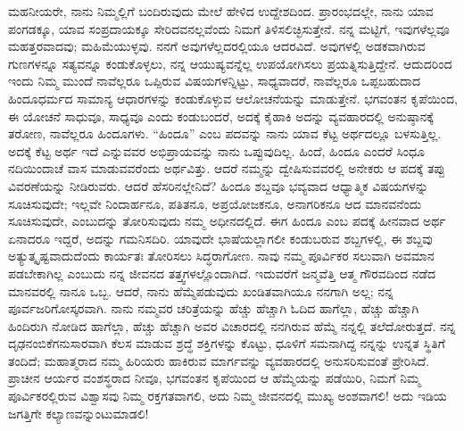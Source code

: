 ಮಹನೀಯರೇ, ನಾನು ನಿಮ್ಮಲ್ಲಿಗೆ ಬಂದಿರುವುದು ಮೇಲೆ ಹೇಳಿದ ಉದ್ದೇಶದಿಂದ. ಪ್ರಾರಂಭದಲ್ಲೇ, ನಾನು ಯಾವ ಪಂಗಡಕ್ಕೂ, ಯಾವ ಸಂಪ್ರದಾಯಕ್ಕೂ ಸೇರಿದವನಲ್ಲವೆಂದು ನಿಮಗೆ ತಿಳಿಸಲಿಚ್ಛಿಸುತ್ತೇನೆ. ನನ್ನ ಮಟ್ಟಿಗೆ, ಇವುಗಳೆಲ್ಲವೂ ಮಹತ್ತರವಾದವು; ಮಹಿಮೆಯುಳ್ಳವು. ನನಗೆ ಅವುಗಳೆಲ್ಲದರಲ್ಲಿಯೂ ಆದರವಿದೆ. ಅವುಗಳಲ್ಲಿ ಅಡಕವಾಗಿರುವ ಗುಣಗಳನ್ನೂ ಸತ್ಯವನ್ನೂ ಕಂಡುಕೊಳ್ಳಲು, ನನ್ನ ಆಯುಷ್ಯವನ್ನೆಲ್ಲ ಉಪಯೋಗಿಸಲು ಪ್ರಯತ್ನಿಸುತ್ತಿದ್ದೇನೆ. ಆದುದರಿಂದ ಇಂದು ನಿಮ್ಮ ಮುಂದೆ ನಾವೆಲ್ಲರೂ ಒಪ್ಪಿರುವ ವಿಷಯಗಳನ್ನಿಟ್ಟು, ಸಾಧ್ಯವಾದರೆ, ನಾವೆಲ್ಲರೂ ಒಪ್ಪಬಹುದಾದ ಹಿಂದೂಧರ್ಮದ ಸಾಮಾನ್ಯ ಆಧಾರಗಳನ್ನು ಕಂಡುಕೊಳ್ಳುವ ಆಲೋಚನೆಯನ್ನು ಮಾಡುತ್ತೇನೆ. ಭಗವಂತನ ಕೃಪೆಯಿಂದ, ಈ ಯೋಚನೆ ಸಾಧುವೂ, ಸಾಧ್ಯವೂ ಎಂದು ಕಂಡುಬಂದರೆ, ಅದಕ್ಕೆ ಕೈಹಾಕಿ ಅದನ್ನು ವ್ಯವಹಾರದಲ್ಲಿ ಅನುಷ್ಠಾನಕ್ಕೆ ತರೋಣ, ನಾವೆಲ್ಲರೂ ಹಿಂದೂಗಳು. “ಹಿಂದೂ” ಎಂಬ ಪದವನ್ನು ನಾನು ಯಾವ ಕೆಟ್ಟ ಅರ್ಥದಲ್ಲೂ ಬಳಸುತ್ತಿಲ್ಲ. ಅದಕ್ಕೆ ಕೆಟ್ಟ ಅರ್ಥ ಇದೆ ಎನ್ನುವವರ ಅಭಿಪ್ರಾಯವನ್ನು ನಾನು ಒಪ್ಪುವುದಿಲ್ಲ. ಹಿಂದೆ, ಹಿಂದೂ ಎಂದರೆ ಸಿಂಧೂ ನದಿಯಿಂದಾಚೆ ವಾಸ ಮಾಡುವವರೆಂದು ಅರ್ಥವಿತ್ತು. ಆದರೆ ನಮ್ಮನ್ನು ದ್ವೇಷಿಸುವವರಲ್ಲಿ ಅನೇಕರು ಆ ಪದಕ್ಕೆ ತಪ್ಪು ವಿವರಣೆಯನ್ನು ನೀಡಿರುವರು. ಆದರೆ ಹೆಸರಿನಲ್ಲೇನಿದೆ? ಹಿಂದೂ ಶಬ್ದವೂ ಭವ್ಯವಾದ ಆಧ್ಯಾತ್ಮಿಕ ವಿಷಯಗಳನ್ನು ಸೂಚಿಸುವುದೇ; ಇಲ್ಲವೇ ನಿಂದಾರ್ಹನೂ, ಪತಿತನೂ, ಅಪ್ರಯೋಜಕನೂ, ಅನಾಗರಿಕನೂ ಆದ ಮಾನವನೆಂದು ಸೂಚಿಸುವುದೇ, ಎಂಬುದನ್ನು ತೋರಿಸುವುದು ನಮ್ಮ ಅಧೀನದಲ್ಲಿದೆ. ಈಗ ಹಿಂದೂ ಎಂಬ ಪದಕ್ಕೆ ಹೀನವಾದ ಅರ್ಥ ಏನಾದರೂ ಇದ್ದರೆ, ಅದನ್ನು ಗಮನಿಸದಿರಿ. ಯಾವುದೇ ಭಾಷೆಯಲ್ಲಾಗಲೀ ಕಂಡುಬರುವ ಶಬ್ದಗಳಲ್ಲಿ, ಈ ಶಬ್ದವು ಅತ್ಯುತ್ಕೃಷ್ಟವಾದುದೆಂದು ಕಾರ್ಯತಃ ತೋರಿಸಲು ಸಿದ್ಧರಾಗೋಣ. ನಾವು ನಮ್ಮ ಪೂರ್ವಿಕರ ಸಲುವಾಗಿ ಅವಮಾನ ಪಡಬೇಕಾಗಿಲ್ಲ ಎಂಬುದು ನನ್ನ ಜೀವನದ ತತ್ತ್ವಗಳಲ್ಲೊಂದಾಗಿದೆ. ಇದುವರೆಗೆ ಜನ್ಮವೆತ್ತಿ ಆತ್ಮ ಗೌರವದಿಂದ ನಡೆದ ಮಾನವರಲ್ಲಿ ನಾನೂ ಒಬ್ಬ. ಆದರೆ, ನಾನು ಹೆಮ್ಮೆಪಡುವುದು ಖಂಡಿತವಾಗಿಯೂ ನನಗಾಗಿ ಅಲ್ಲ; ನನ್ನ ಪೂರ್ವಜರಿಗೋಸ್ಕರವಾಗಿ. ನಾನು ನಮ್ಮವರ ಚರಿತ್ರೆಯನ್ನು ಹೆಚ್ಚು ಹೆಚ್ಚಾಗಿ ಓದಿದ ಹಾಗೆಲ್ಲಾ, ಹೆಚ್ಚು ಹೆಚ್ಚಾಗಿ ಹಿಂದಿರುಗಿ ನೋಡಿದ ಹಾಗೆಲ್ಲಾ, ಹೆಚ್ಚು ಹೆಚ್ಚಾಗಿ ಅವರ ವಿಚಾರದಲ್ಲಿ ನನಗಿರುವ ಹೆಮ್ಮೆ ನನ್ನಲ್ಲಿ ತಲೆದೋರುತ್ತದೆ. ನನ್ನ ದೃಢನಂಬಿಕೆಗನುಸಾರವಾಗಿ ಕೆಲಸ ಮಾಡುವ ಶ್ರದ್ಧೆ ಶಕ್ತಿಗಳನ್ನು ಕೊಟ್ಟು, ಧೂಳಿಗೆ ಸಮನಾಗಿದ್ದ ನನ್ನನ್ನು ಉನ್ನತ ಸ್ಥಿತಿಗೆ ತಂದಿದೆ; ಮಹಾತ್ಮರಾದ ನಮ್ಮ ಹಿರಿಯರು ಹಾಕಿರುವ ಮಾರ್ಗವನ್ನು ವ್ಯವಹಾರದಲ್ಲಿ ಅನುಸರಿಸುವಂತೆ ಪ್ರೇರಿಸಿದೆ. ಪ್ರಾಚೀನ ಆರ್ಯರ ವಂಶಸ್ಥರಾದ ನೀವೂ, ಭಗವಂತನ ಕೃಪೆಯಿಂದ ಆ ಹೆಮ್ಮೆಯನ್ನು ಪಡೆಯಿರಿ, ನಿಮಗೆ ನಿಮ್ಮ ಪೂರ್ವಿಕರಲ್ಲಿರುವ ವಿಶ್ವಾಸವು ನಿಮ್ಮ ರಕ್ತಗತವಾಗಲಿ, ಅದು ನಿಮ್ಮ ಜೀವನದಲ್ಲಿ ಮುಖ್ಯ ಅಂಶವಾಗಲಿ! ಅದು ಇಡಿಯ ಜಗತ್ತಿಗೇ ಕಲ್ಯಾಣವನ್ನುಂಟುಮಾಡಲಿ!

\vskip 5pt

